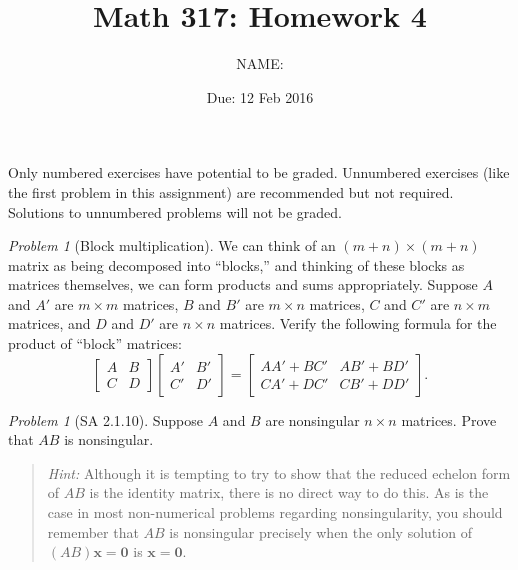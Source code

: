 \documentclass[fleqn,11pt]{paper}
\author         {NAME:                     }
\title{Math 317: Homework 4}
\date{Due: 12 Feb 2016}
\theoremstyle{remark}
\newtheorem{problem}{Problem}
\newtheorem*{prob}{Problem}
\newtheorem*{solution}{{\bf Solution}}
\renewcommand{\vec}[1]{\mathbf{#1}}
\newcommand{\<}{\ensuremath{\langle}}
\renewcommand{\>}{\ensuremath{\rangle}}
\newcommand\vx{\vec{x}}
\newcommand\vzero{\vec{0}}
\begin{document}
\maketitle
{} Only numbered exercises have potential to be graded.  Unnumbered exercises 
(like the first problem in this assignment) are recommended but not required. Solutions to unnumbered problems
will not be graded.

\begin{prob}[Block multiplication] We can think of an $(m + n) \times (m + n)$ 
matrix as being decomposed into ``blocks,'' and thinking of these blocks as matrices themselves, we
can form products and sums appropriately. Suppose $A$ and $A'$ are $m \times m$ matrices, $B$ and $B'$
are $m \times n$ matrices, $C$ and $C'$ are $n \times m$ matrices, and $D$ and $D'$ are 
$n \times n$ matrices.
Verify the following formula for the product of ``block'' matrices:
\begin{equation}
  \label{eq:1}
\left[ 
  \begin{array}{c|c}
    A &B \\
    \hline 
    C &D 
  \end{array}
\right]
\left[ 
  \begin{array}{c|c}A' &B' \\ \hline C' &D' \end{array}
\right]
  =
\left[ 
  \begin{array}{c|c}
    AA' + BC' & AB' + BD' \\ 
    \hline 
    CA' + DC' & CB'+ DD' 
  \end{array}
\right].
\end{equation}
\end{prob}
\newpage

\begin{problem}[SA 2.1.10]
  Suppose $A$ and $B$ are nonsingular $n \times n$ matrices.
  Prove that $AB$ is nonsingular.
  \begin{quote}
    {\it Hint:} Although it is tempting to try to show that the reduced echelon
    form of $AB$ is the identity matrix, there is no direct way to do this. As is
    the case in most non-numerical problems regarding nonsingularity, you should
    remember that $AB$ is nonsingular precisely when the only solution of
    $(AB)\vx = \vzero$ is $\vx = \vzero$.
  \end{quote}
  
\end{problem}
\newpage
\end{document}

